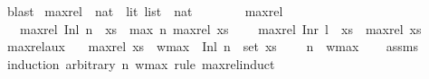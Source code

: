 \begin{isabellebody}
\ blast%
\endisatagproof
{\isafoldproof}%
%
\isadelimproof
\isanewline
%
\endisadelimproof
\isanewline
{}\isamarkupfalse%
\ max{\isacharunderscore}{\kern0pt}rel\ {\isacharcolon}{\kern0pt}{\isacharcolon}{\kern0pt}\ {\isachardoublequoteopen}{\isacharparenleft}{\kern0pt}nat\ {\isacharplus}{\kern0pt}\ lit{\isacharparenright}{\kern0pt}\ list\ {\isasymRightarrow}\ nat{\isachardoublequoteclose}\isanewline
\ \ \ \isanewline
\ \ \ \ {\isachardoublequoteopen}max{\isacharunderscore}{\kern0pt}rel\ {\isacharbrackleft}{\kern0pt}{\isacharbrackright}{\kern0pt}\ {\isacharequal}{\kern0pt}\ {}{\isachardoublequoteclose}\isanewline
\ \ {\isacharbar}{\kern0pt}\ {\isachardoublequoteopen}max{\isacharunderscore}{\kern0pt}rel\ {\isacharparenleft}{\kern0pt}{\isacharparenleft}{\kern0pt}Inl\ n{\isacharparenright}{\kern0pt}\ {\isacharhash}{\kern0pt}\ xs{\isacharparenright}{\kern0pt}\ {\isacharequal}{\kern0pt}\ {\isacharparenleft}{\kern0pt}max\ n\ {\isacharparenleft}{\kern0pt}max{\isacharunderscore}{\kern0pt}rel\ xs{\isacharparenright}{\kern0pt}{\isacharparenright}{\kern0pt}{\isachardoublequoteclose}\ \isanewline
\ \ {\isacharbar}{\kern0pt}\ {\isachardoublequoteopen}max{\isacharunderscore}{\kern0pt}rel\ {\isacharparenleft}{\kern0pt}{\isacharparenleft}{\kern0pt}Inr\ l{\isacharparenright}{\kern0pt}\ {\isacharhash}{\kern0pt}\ xs{\isacharparenright}{\kern0pt}\ {\isacharequal}{\kern0pt}\ {\isacharparenleft}{\kern0pt}max{\isacharunderscore}{\kern0pt}rel\ xs{\isacharparenright}{\kern0pt}{\isachardoublequoteclose}\isanewline
\isanewline
\isanewline
{}\isamarkupfalse%
\ max{\isacharunderscore}{\kern0pt}rel{\isacharunderscore}{\kern0pt}aux{\isacharcolon}{\kern0pt}\isanewline
\ \ \ {\isachardoublequoteopen}max{\isacharunderscore}{\kern0pt}rel\ xs\ {\isacharequal}{\kern0pt}\ w{\isacharunderscore}{\kern0pt}max{\isachardoublequoteclose}\ \ {\isachardoublequoteopen}{\isacharparenleft}{\kern0pt}Inl\ n{\isacharparenright}{\kern0pt}\ {\isasymin}\ set\ xs{\isachardoublequoteclose}\ \isanewline
\ \ \ {\isachardoublequoteopen}n\ {\isasymle}\ w{\isacharunderscore}{\kern0pt}max{\isachardoublequoteclose}\isanewline
%
\isadelimproof
\ \ %
\endisadelimproof
%
\isatagproof
{}\isamarkupfalse%
\ assms\isanewline
\ \ \isamarkupfalse%
\ {\isacharparenleft}{\kern0pt}induction\ arbitrary{\isacharcolon}{\kern0pt}\ n\ w{\isacharunderscore}{\kern0pt}max\ rule{\isacharcolon}{\kern0pt}\ max{\isacharunderscore}{\kern0pt}rel{\isachardot}{\kern0pt}induct{\isacharparenright}{\kern0pt}\isanewline

\end{isabellebody}
